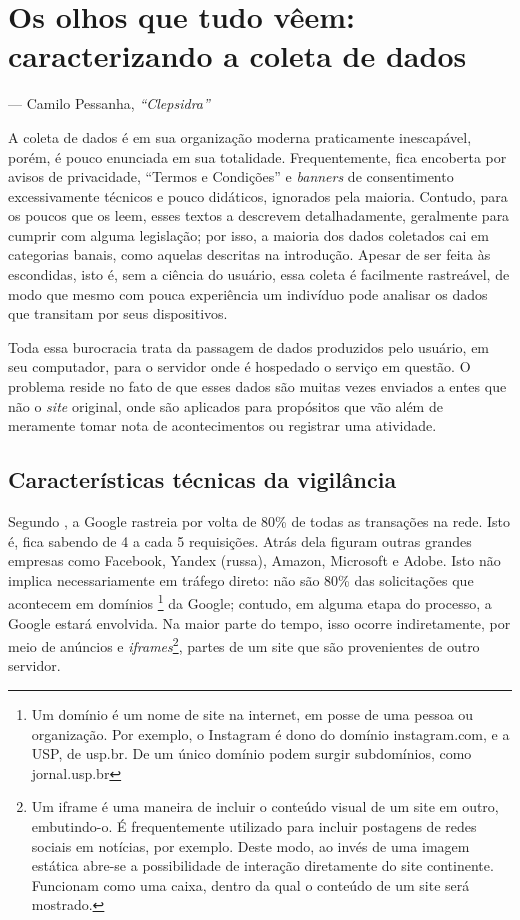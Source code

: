 \chapter{Os olhos que tudo vêem: caracterizando a coleta de dados}

\epigraph{}{--- Camilo Pessanha, \textit{``Clepsidra''}}

A coleta de dados é em sua organização moderna praticamente inescapável, porém, é pouco enunciada em sua totalidade.
Frequentemente, fica encoberta por avisos de privacidade, ``Termos e Condições'' e \textit{banners} de consentimento excessivamente técnicos e pouco didáticos, ignorados pela maioria.
Contudo, para os poucos que os leem, esses textos a descrevem detalhadamente, geralmente para cumprir com alguma legislação; por isso, a maioria dos dados coletados cai em categorias banais, como aquelas descritas na introdução.
Apesar de ser feita às escondidas, isto é, sem a ciência do usuário, essa coleta é facilmente rastreável, de modo que mesmo com pouca experiência um indivíduo pode analisar os dados que transitam por seus dispositivos.

Toda essa burocracia trata da passagem de dados produzidos pelo usuário, em seu computador, para o servidor onde é hospedado o serviço em questão.
O problema reside no fato de que esses dados são muitas vezes enviados a entes que não o \textit{site} original, onde são aplicados para propósitos que vão além de meramente tomar nota de acontecimentos ou registrar uma atividade.

\section{Características técnicas da vigilância}
Segundo \textcite[p.~23]{cyphers_oneway_2019}, a Google rastreia por volta de 80\% de todas as transações na rede. 
Isto é, fica sabendo de 4 a cada 5 requisições. Atrás dela figuram outras grandes empresas como Facebook, Yandex (russa), Amazon, Microsoft e Adobe. 
Isto não implica necessariamente em tráfego direto: não são 80\% das solicitações que acontecem em domínios
\footnote{Um domínio é um nome de site na internet, em posse de uma pessoa ou organização. Por exemplo, o Instagram é dono do domínio instagram.com, e a USP, de usp.br. De um único domínio podem surgir subdomínios, como jornal.usp.br}
da Google; contudo, em alguma etapa do processo, a Google estará envolvida.
Na maior parte do tempo, isso ocorre indiretamente, por meio de anúncios e \textit{iframes}\footnote{Um iframe é uma maneira de incluir o conteúdo visual de um site em outro, embutindo-o. É frequentemente utilizado para incluir postagens de redes sociais em notícias, por exemplo. Deste modo, ao invés de uma imagem estática abre-se a possibilidade de interação diretamente do site continente. Funcionam como uma caixa, dentro da qual o conteúdo de um site será mostrado.}, partes de um site que são provenientes de outro servidor.

